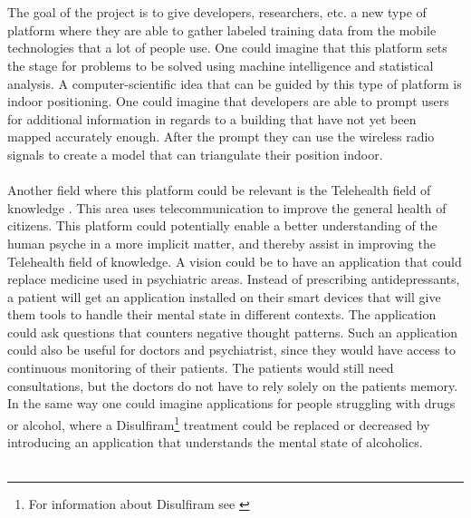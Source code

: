 \\\\
The goal of the project is to give developers, researchers, etc. a new type of platform where they are able to gather labeled training data from the mobile technologies that a lot of people use. One could imagine that this platform sets the stage for problems to be solved using machine intelligence and statistical analysis. A computer-scientific idea that can be guided by this type of platform is indoor positioning. One could imagine that developers are able to prompt users for additional information in regards to a building that have not yet been mapped accurately enough. After the prompt they can use the wireless radio signals to create a model that can triangulate their position indoor. 
\\\\
Another field where this platform could be relevant is the Telehealth field of knowledge \parencite{telehealth_aau}. This area uses telecommunication to improve the general health of citizens. This platform could potentially enable a better understanding of the human psyche in a more implicit matter, and thereby assist in improving the Telehealth field of knowledge. A vision could be to have an application that could replace medicine used in psychiatric areas. Instead of prescribing antidepressants, a patient will get an application installed on their smart devices that will give them tools to handle their mental state in different contexts. The application could ask questions that counters negative thought patterns. Such an application could also be useful for doctors and psychiatrist, since they would have access to continuous monitoring of their patients. The patients would still need consultations, but the doctors do not have to rely solely on the patients memory. In the same way one could imagine applications for people struggling with drugs or alcohol, where a Disulfiram\footnote{For information about Disulfiram see \textcite{nlm_disulfiram}} treatment could be replaced or decreased by introducing an application that understands the mental state of alcoholics.
\\\\
